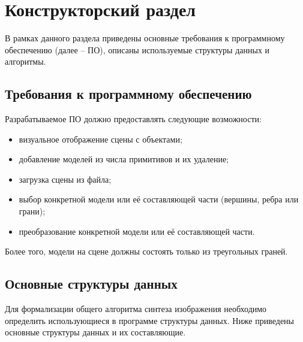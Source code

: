 \chapter{Конструкторский раздел}

В рамках данного раздела приведены основные требования к программному обеспечению (далее -- ПО), описаны используемые структуры данных и алгоритмы.

\section{Требования к программному обеспечению}

Разрабатываемое ПО должно предоставлять следующие возможности:

\begin{itemize}[label=---]
	\item визуальное отображение сцены с объектами;

	\item добавление моделей из числа примитивов и их удаление;
	\item загрузка сцены из файла;
	\item выбор конкретной модели или её составляющей части (вершины, ребра или грани);
	\item преобразование конкретной модели или её составляющей части.
\end{itemize}

Более того, модели на сцене должны состоять только из треугольных граней.
	
\section{Основные структуры данных}

Для формализации общего алгоритма синтеза изображения необходимо определить использующиеся в программе структуры данных. Ниже приведены основные структуры данных и их составляющие.

